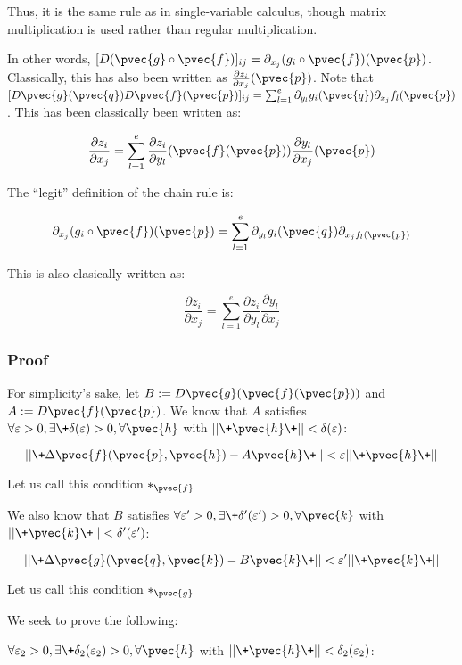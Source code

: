 \documentclass[11 pt, twoside]{article}
\begin{document}
Thus, it is the same rule as in single-variable calculus, though matrix multiplication is used rather than regular multiplication.

In other words, $[D(\pvec{g} \circ
\pvec{f})]_{ij} = \partial_{x_j}(g_i \circ \pvec{f})(\pvec{p})$. Classically, this
has also been written as $\frac{\partial z_i}{\partial x_j} (\pvec{p})$. Note
that $[D\pvec{g}(\pvec{q}) D\pvec{f}(\pvec{p})]_{ij} = \sum_{l = 1}^e \partial_{y_l} g_i
(\pvec{q}) \partial_{x_j} f_l (\pvec{p})$. This has been classically been written
as:

\[
\frac{\partial z_i}{\partial x_j} = \sum_{l = 1}^e \frac{\partial z_i}{\partial y_l} (\pvec{f}(\pvec{p}))
\frac{\partial y_l}{\partial x_j} (\pvec{p})
\]

The ``legit'' definition of the chain rule is:

\[
\partial_{x_j} (g_i \circ \pvec{f})(\pvec{p}) = \sum_{l = 1}^e \partial_{y_l}
g_i(\pvec{q}) \partial_{x_j f_l (\pvec{p})}
\]

This is also clasically written as:

\[
\frac{\partial z_i}{\partial x_j} = \sum_{l=1}^e \frac{\partial
z_i}{\partial y_l} \frac{\partial y_l}{\partial x_j}
\]

\subsubsection{Proof}

For simplicity's sake, let $B := D\pvec{g}(\pvec{f}(\pvec{p}))$ and $A :=
D\pvec{f}(\pvec{p})$. We know that $A$ satisfies $\forall
\varepsilon > 0, \exists\+\delta(\varepsilon) > 0, \forall \pvec{h}$ with
$||\+\pvec{h}\+|| < \delta(\varepsilon)$:

\[
||\+\Delta \pvec{f}(\pvec{p}, \pvec{h}) - A \pvec{h}\+|| < \varepsilon
||\+\pvec{h}\+||
\]

Let us call this condition $*_{\pvec{f}}$

We also know that $B$ satisfies $\forall \varepsilon' > 0, \exists \+
\delta'(\varepsilon') > 0, \forall \pvec{k}$ with
$||\+\pvec{k}\+|| < \delta'(\varepsilon')$:

\[
||\+\Delta \pvec{g}(\pvec{q}, \pvec{k}) - B \pvec{k}\+|| < \varepsilon'
||\+\pvec{k}\+||
\]

Let us call this condition $*_{\pvec{g}}$

We seek to prove the following:

$\forall \varepsilon_2 > 0, \exists\+\delta_2(\varepsilon_2) > 0, \forall
\pvec{h}$ with $||\+\pvec{h}\+|| < \delta_2(\varepsilon_2)$:
\end{document}
